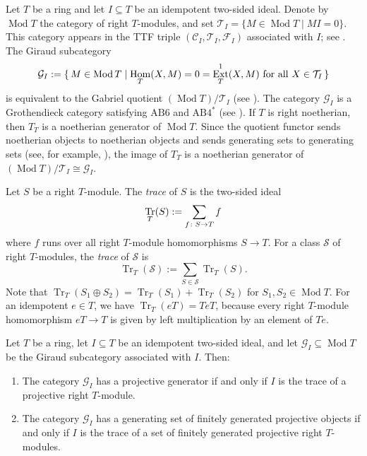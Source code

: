 \documentclass[a4paper,10pt,reqno]{amsart}
\theoremstyle{definition}
\theoremstyle{plain}
\numberwithin{equation}{section}
\newcommand{\cC}{\mathcal{C}}
\newcommand{\cF}{\mathcal{F}}
\newcommand{\cG}{\mathcal{G}}
\newcommand{\cS}{\mathcal{S}}
\newcommand{\cT}{\mathcal{T}}
\newcommand{\setwithcondition}[3][]{\mathopen{#1\{}\,#2\mathrel{#1|}#3\,\mathclose{#1\}}}
\DeclareMathOperator{\Hom}{Hom}
\DeclareMathOperator{\Ext}{Ext}
\let\Im\relax
\DeclareMathOperator{\Im}{Im}
\DeclareMathOperator{\Mod}{Mod}
\DeclareMathOperator{\Tr}{Tr}
\newcommand{\ABfourst}{\mathrm{AB4}^{\ast}}
\newcommand{\ABsix}{\mathrm{AB6}}
\begin{document}
Let $T$ be a ring and let $I\subseteq T$ be an idempotent two-sided ideal. Denote by $\Mod T$ the category of right $T$-modules, and set $\cT_{I}=\{M\in\Mod T\mid MI=0\}$. This category appears in the TTF triple $(\cC_{I},\cT_{I},\cF_{I})$ associated with $I$; see \cite[Proposition~4.1]{arXiv:2508.00670v2}. The Giraud subcategory
\begin{equation*}
\cG_{I}:=\setwithcondition{M\in\Mod T}{\textnormal{$\Hom_{T}(X,M)=0=\Ext^{1}_{T}(X,M)$ for all $X\in\cT_{I}$}}
\end{equation*}
is equivalent to the Gabriel quotient $(\Mod T)/\cT_{I}$ (see \cite[Section~1.2]{arXiv:2508.00670v2}). The category $\cG_{I}$ is a Grothendieck category satisfying $\ABsix$ and $\ABfourst$ (see \cite[Proposition~5.2]{arXiv:2508.00670v2}). If $T$ is right noetherian, then $T_{T}$ is a noetherian generator of $\Mod T$. Since the quotient functor sends noetherian objects to noetherian objects and sends generating sets to generating sets (see, for example, \cite[Proposition~2.6]{MR3922832}), the image of $T_{T}$ is a noetherian generator of $(\Mod T)/\cT_I\cong\cG_I$.

Let $S$ be a right $T$-module. The \emph{trace} of $S$ is the two-sided ideal
\begin{equation*}
\Tr_{T}(S):=\sum_{f\colon S\to T}\Im f
\end{equation*}
where $f$ runs over all right $T$-module homomorphisms $S\to T$. For a class $\cS$ of right $T$-modules, the \emph{trace} of $\cS$ is
\begin{equation*}
\Tr_{T}(\cS):=\sum_{S\in\cS}\Tr_{T}(S).
\end{equation*}
Note that $\Tr_{T}(S_{1}\oplus S_{2})=\Tr_{T}(S_{1})+\Tr_{T}(S_{2})$ for $S_{1},S_{2}\in\Mod T$. For an idempotent $e\in T$, we have $\Tr_{T}(eT)=TeT$, because every right $T$-module homomorphism $eT\to T$ is given by left multiplication by an element of $Te$.

\begin{theorem}\label{42681573}
Let $T$ be a ring, let $I\subseteq T$ be an idempotent two-sided ideal, and let $\cG_{I}\subseteq\Mod T$ be the Giraud subcategory associated with $I$. Then:
\begin{enumerate}
\item The category $\cG_{I}$ has a projective generator if and only if $I$ is the trace of a projective right $T$-module.
\item The category $\cG_{I}$ has a generating set of finitely generated projective objects if and only if $I$ is the trace of a set of finitely generated projective right $T$-modules.
\end{enumerate}
\end{theorem}
\end{document}
